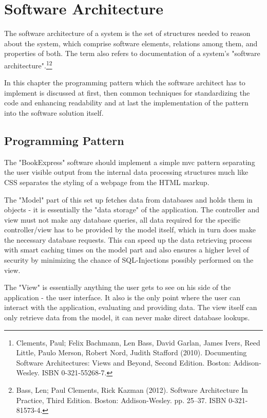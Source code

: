 \documentclass[11pt,a4paper,oneside,svgnames]{report}
\begin{document}
\chapter{Software Architecture}
The software architecture of a system is the set of structures needed to reason about the system, which comprise software elements, relations among them, and properties of both. The term also refers to documentation of a system's "software architecture".\footnote{ Clements, Paul; Felix Bachmann, Len Bass, David Garlan, James Ivers, Reed Little, Paulo Merson, Robert Nord, Judith Stafford (2010). Documenting Software Architectures: Views and Beyond, Second Edition. Boston: Addison-Wesley. ISBN 0-321-55268-7.}\footnote{Bass, Len; Paul Clements, Rick Kazman (2012). Software Architecture In Practice, Third Edition. Boston: Addison-Wesley. pp. 25–37. ISBN 0-321-81573-4.}

In this chapter the programming pattern which the software architect has to implement is discussed at first, then common techniques for standardizing the code and enhancing readability and at last the implementation of the pattern into the software solution itself.

\section{Programming Pattern}
The "BookExpress" software should implement a simple \gls{mvc} pattern separating the user visible output from the internal data processing structures much like CSS separates the styling of a webpage from the HTML markup.

The "Model" part of this set up fetches data from databases and holds them in objects - it is essentially the "data storage" of the application. The controller and view must not make any database queries, all data required for the specific controller/view has to be provided by the model itself, which in turn does make the necessary database requests. This can speed up the data retrieving process with smart caching times on the model part and also ensures a higher level of security by minimizing the chance of SQL-Injections possibly performed on the view.

The "View" is essentially anything the user gets to see on his side of the application - the user interface. It also is the only point where the user can interact with the application, evaluating and providing data. The view itself can only retrieve data from the model, it can never make direct database lookups.
\end{document}
